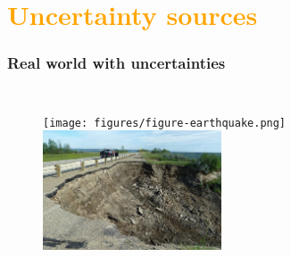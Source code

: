 
\section{\textcolor{orange}{Uncertainty sources}} %



\begin{frame}
	\frametitle{Real world with uncertainties}
\begin{columns}
            
    \begin{figure}
    \texttt{[image: figures/figure-earthquake.png]}    
    \includegraphics[width = 5.3cm]{figures/figure-embankment.png}    
    \end{figure}    
\end{columns}
\end{frame}

